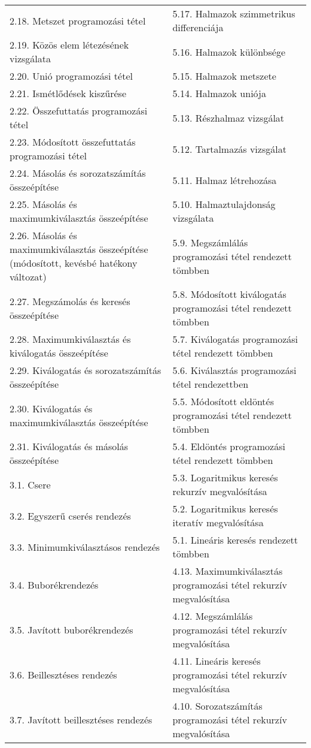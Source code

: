 \begin{tabularx}{\textwidth}{X X}
2.18. Metszet programozási tétel & 5.17. Halmazok szimmetrikus differenciája \\
2.19. Közös elem létezésének vizsgálata & 5.16. Halmazok különbsége \\
2.20. Unió programozási tétel & 5.15. Halmazok metszete \\
2.21. Ismétlődések kiszűrése & 5.14. Halmazok uniója \\
2.22. Összefuttatás programozási tétel & 5.13. Részhalmaz vizsgálat \\
2.23. Módosított összefuttatás programozási tétel & 5.12. Tartalmazás vizsgálat \\
2.24. Másolás és sorozatszámítás összeépítése & 5.11. Halmaz létrehozása \\
2.25. Másolás és maximumkiválasztás összeépítése & 5.10. Halmaztulajdonság vizsgálata \\
2.26. Másolás és maximumkiválasztás összeépítése (módosított, kevésbé hatékony változat) & 5.9. Megszámlálás programozási tétel rendezett tömbben \\
2.27. Megszámolás és keresés összeépítése & 5.8. Módosított kiválogatás programozási tétel rendezett tömbben \\
2.28. Maximumkiválasztás és kiválogatás összeépítése & 5.7. Kiválogatás programozási tétel rendezett tömbben \\
2.29. Kiválogatás és sorozatszámítás összeépítése & 5.6. Kiválasztás programozási tétel rendezettben \\
2.30. Kiválogatás és maximumkiválasztás összeépítése & 5.5. Módosított eldöntés programozási tétel rendezett tömbben \\
2.31. Kiválogatás és másolás összeépítése & 5.4. Eldöntés programozási tétel rendezett tömbben \\
3.1. Csere & 5.3. Logaritmikus keresés rekurzív megvalósítása \\
3.2. Egyszerű cserés rendezés & 5.2. Logaritmikus keresés iteratív megvalósítása \\
3.3. Minimumkiválasztásos rendezés & 5.1. Lineáris keresés rendezett tömbben \\
3.4. Buborékrendezés & 4.13. Maximumkiválasztás programozási tétel rekurzív megvalósítása \\
3.5. Javított buborékrendezés & 4.12. Megszámlálás programozási tétel rekurzív megvalósítása \\
3.6. Beillesztéses rendezés & 4.11. Lineáris keresés programozási tétel rekurzív megvalósítása \\
3.7. Javított beillesztéses rendezés & 4.10. Sorozatszámítás programozási tétel rekurzív megvalósítása \\

\end{tabularx}
